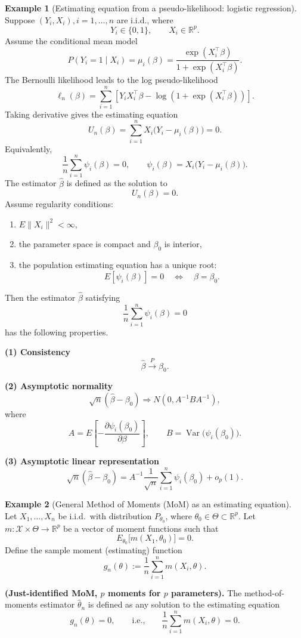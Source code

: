 \documentclass[11pt]{article}
\theoremstyle{definition}
\newtheorem{exmp}{Example}[section]
\begin{document}
\begin{exmp}[Estimating equation from a pseudo-likelihood: logistic regression]
Suppose $(Y_i,X_i), i=1,\dots,n$ are i.i.d., where
\[
Y_i \in \{0,1\}, \qquad X_i \in \mathbb{R}^p .
\]
Assume the conditional mean model
\[
P(Y_i=1\mid X_i)=\mu_i(\beta)
=
\frac{\exp(X_i^\top\beta)}{1+\exp(X_i^\top\beta)} .
\]
The Bernoulli likelihood leads to the log pseudo-likelihood
\[
\ell_n(\beta)
=
\sum_{i=1}^n
\left[
Y_i X_i^\top\beta
-
\log(1+\exp(X_i^\top\beta))
\right].
\]
Taking derivative gives the estimating equation
\[
U_n(\beta)
=
\sum_{i=1}^n
X_i\big(Y_i-\mu_i(\beta)\big)
=
0.
\]
Equivalently,
\[
\frac{1}{n}\sum_{i=1}^n \psi_i(\beta)=0,
\qquad
\psi_i(\beta)=X_i\big(Y_i-\mu_i(\beta)\big).
\]
The estimator $\hat\beta$ is defined as the solution to
\[
U_n(\beta)=0 .
\]
Assume regularity conditions:
\begin{enumerate}
\item $E\|X_i\|^2<\infty$,
\item the parameter space is compact and $\beta_0$ is interior,
\item the population estimating equation has a unique root:
\[
E[\psi_i(\beta)]=0 \quad \Longleftrightarrow \quad \beta=\beta_0.
\]
\end{enumerate}
Then the estimator $\hat\beta$ satisfying
\[
\frac{1}{n}\sum_{i=1}^n \psi_i(\beta)=0
\]
has the following properties.

\textbf{(1) Consistency}
\[
\hat\beta \xrightarrow{P} \beta_0 .
\]

\textbf{(2) Asymptotic normality}
\[
\sqrt n(\hat\beta-\beta_0)
\Rightarrow
N\!\left(0, A^{-1} B A^{-1}\right),
\]
where
\[
A
=
E\!\left[
-\frac{\partial \psi_i(\beta_0)}{\partial\beta}
\right],
\qquad
B
=
\operatorname{Var}\!\big(\psi_i(\beta_0)\big).
\]

\textbf{(3) Asymptotic linear representation}
\[
\sqrt n(\hat\beta-\beta_0)
=
A^{-1}
\frac{1}{\sqrt n}
\sum_{i=1}^n
\psi_i(\beta_0)
+
o_p(1).
\]
\end{exmp}
\begin{exmp}[General Method of Moments (MoM) as an estimating equation]
Let $X_1,\dots,X_n$ be i.i.d.\ with distribution $P_{\theta_0}$, where
$\theta_0\in\Theta\subset\mathbb{R}^p$.
Let $m:\mathcal{X}\times\Theta\to\mathbb{R}^p$ be a vector of moment functions such that
\[
E_{\theta_0}\big[m(X_1,\theta_0)\big]=0.
\]
Define the sample moment (estimating) function
\[
g_n(\theta):=\frac{1}{n}\sum_{i=1}^n m(X_i,\theta).
\]

\textbf{(Just-identified MoM, $p$ moments for $p$ parameters).}
The method-of-moments estimator $\hat\theta_n$ is defined as any solution to the estimating equation
\[
g_n(\theta)=0,
\qquad\text{i.e.,}\qquad
\frac{1}{n}\sum_{i=1}^n m(X_i,\theta)=0.
\]
\end{exmp}
\end{document}

